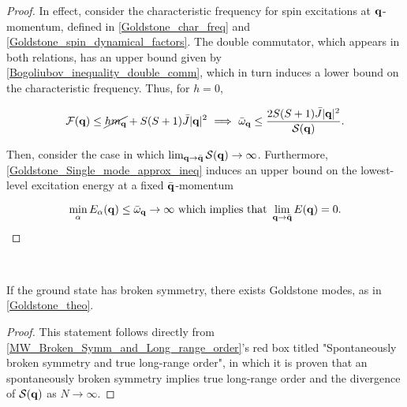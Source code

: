 \documentclass{homework}
\begin{document}
\begin{proof}

In effect, consider the characteristic frequency for spin excitations at ${\bf q}$-momentum, defined in \cref{Goldstone_char_freq} and \cref{Goldstone_spin_dynamical_factors}. The double commutator, which appears in both relations, has an upper bound given by \cref{Bogoliubov_inequality_double_comm}, which in turn induces a lower bound on the characteristic frequency. Thus, for $h=0$, 

\begin{equation}
    \mathcal{F}({\bf q}) \leq \cancel{h m_{{\bf q}}} + S(S+1) \bar{J} |{\bf q}|^2 \textnormal{ } \Longrightarrow \textnormal{ } \bar{\omega}_{{\bf q}} \leq \frac{2S(S+1) \bar{J} |{\bf q}|^2}{\mathcal{S}({\bf q})}.
\end{equation}

Then, consider the case in which $\lim_{{\bf q} \rightarrow \bar{\bf q}} \mathcal{S}({\bf q}) \rightarrow \infty$. Furthermore, \cref{Goldstone_Single_mode_approx_ineq} induces an upper bound on the lowest-level excitation energy at a fixed $\bar{\bf q}$-momentum  

$$    
\min_{\alpha} E_{\alpha}({\bf q}) \leq \bar{\omega}_{{\bf q}} \rightarrow \infty \textnormal{ which implies that } \lim_{{\bf q} \rightarrow \bar{\bf q}} E({\bf q}) = 0.
$$
\end{proof}

\blanky \\

\begin{corr}

If the ground state has broken symmetry, there exists Goldstone modes, as in \cref{Goldstone_theo}. 

\end{corr}

\begin{proof}

This statement follows directly from \cref{MW_Broken_Symm_and_Long_range_order}'s red box titled "Spontaneously broken symmetry and true long-range order", in which it is proven that an spontaneously broken symmetry implies true long-range order and the divergence of $\mathcal{S}({\bf q})$ as $N \rightarrow \infty$. 

\end{proof}

\blanky \\
\end{document}
